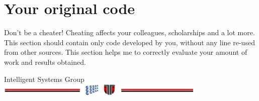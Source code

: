 \documentclass[a4paper,12pt]{report}
\begin{document}
%






\appendix

\chapter{Your original code}
Don't be a cheater! Cheating affects your colleagues, scholarships and a lot more.
This section should contain only code developed by you, without any line re-used from other sources. 
This section helps me to correctly evaluate your amount of work and results obtained. 


\vspace{2cm}
\begin{center}
Intelligent Systems Group\\
\includegraphics[width=10cm]{fig/footer}
\end{center}
\end{document}
